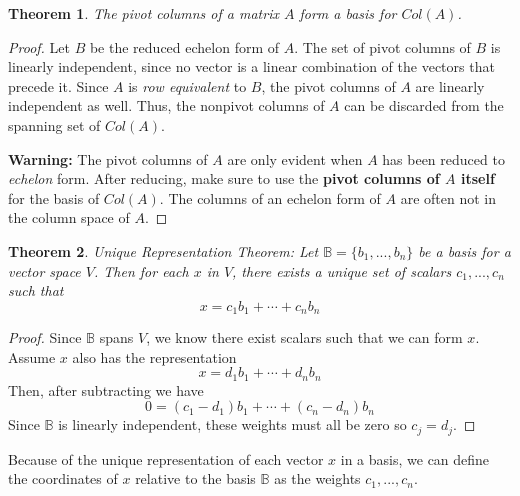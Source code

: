 \documentclass[letterpaper]{article}
\newtheorem{theorem}{Theorem}
\theoremstyle{definition}
\begin{document}
\begin{theorem}
The pivot columns of a matrix $A$ form a basis for $Col(A)$. 
\end{theorem}

\begin{proof}
Let $B$ be the reduced echelon form of $A$. The set of pivot columns of $B$ is linearly independent, since no vector is a linear combination of the vectors that precede it. Since $A$ is \textit{row equivalent} to $B$, the pivot columns of $A$ are linearly independent as well. Thus, the nonpivot columns of $A$ can be discarded from the spanning set of $Col(A)$. 

\textbf{Warning:} The pivot columns of $A$ are only evident when $A$ has been reduced to \textit{echelon} form. After reducing, make sure to use the \textbf{pivot columns of $A$ itself} for the basis of $Col(A)$. The columns of an echelon form of $A$ are often not in the column space of $A$. 
\end{proof}

\begin{theorem}{Unique Representation Theorem: }
Let $\mathbb{B} = \{ b_1 , ..., b_n \}$ be a basis for a vector space $V$. Then for each $x$ in $V$, there exists a unique set of scalars $c_1 ,..., c_n$ such that 
$$x = c_1 b_1 + \cdots + c_n b_n$$
\end{theorem}

\begin{proof}
Since $\mathbb{B}$ spans $V$, we know there exist scalars such that we can form $x$. Assume $x$ also has the representation 
$$ x = d_1 b_1 + \cdots + d_n b_n$$
Then, after subtracting we have
$$ 0 = (c_1 - d_1) b_1 + \cdots + (c_n - d_n) b_n$$
Since $\mathbb{B}$ is linearly independent, these weights must all be zero so $c_j = d_j$. 
\end{proof}

Because of the unique representation of each vector $x$ in a basis, we can define the coordinates of $x$ relative to the basis $\mathbb{B}$ as the weights $c_1 , ..., c_n$. 
\end{document}

